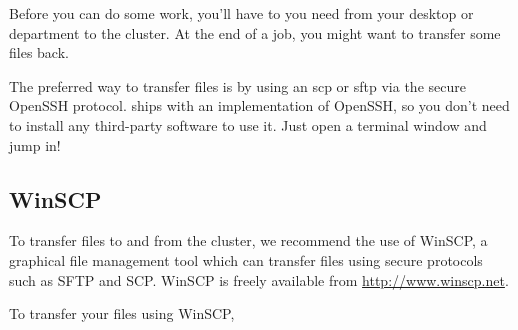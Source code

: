 Before you can do some work, you'll have to 
you need from your desktop or department to the cluster. At the end of a job,
you might want to transfer some files back.

\ifmacORlinux
The preferred way to transfer files is by using an scp or sftp via the secure
OpenSSH protocol.  \OS  ships with an implementation of
OpenSSH, so you don't need to install any third-party software to use it. Just
open a terminal window and jump in!
\fi

\ifwindows
  \subsection{WinSCP}

  To transfer files to and from the cluster, we recommend the use of
  WinSCP, a graphical file management tool which can transfer files
  using secure protocols such as SFTP and SCP.  WinSCP is freely
  available from \url{http://www.winscp.net}.

  To transfer your files using WinSCP,

